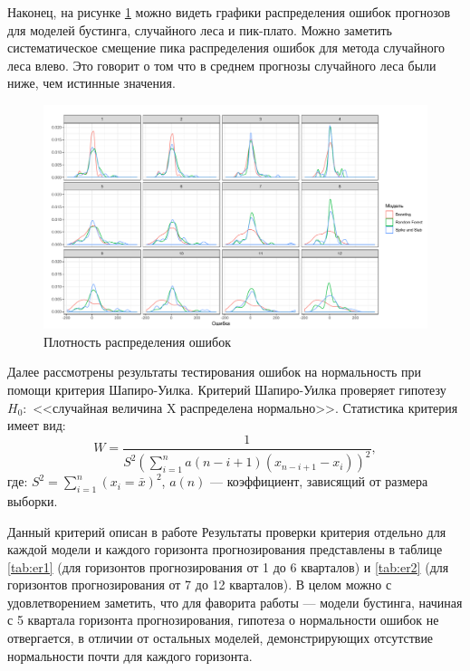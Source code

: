 Наконец, на рисунке \ref{fig:error3} можно видеть графики распределения ошибок прогнозов для моделей бустинга, случайного леса и пик-плато. Можно заметить систематическое смещение пика распределения ошибок для метода случайного леса влево. Это говорит о том что в среднем прогнозы случайного леса были ниже, чем истинные значения.
\begin{figure}[hp]
    \centering
    \includegraphics[width = \textwidth]{error3.pdf}
    \caption{Плотность распределения ошибок}
    \label{fig:error3}
\end{figure}

Далее рассмотрены результаты тестирования ошибок на нормальность при помощи критерия Шапиро-Уилка. Критерий Шапиро-Уилка проверяет гипотезу $H_0:$ <<случайная величина X распределена нормально>>. Статистика критерия имеет вид:
\begin{equation}
    W = \frac{1}{S^2\left(\sum_{i=1}^n a(n-i+1) (x_{n-i+1} - x_i)\right)^2},
\end{equation}
где: $S^2 = \sum_{i=1}^{n} \left(x_i = \bar{x}\right)^2$, $a(n)$ --- коэффициент, зависящий от размера выборки.

Данный критерий описан в работе \cite{shapiro1965analysis}
Результаты проверки критерия отдельно для каждой модели и каждого горизонта прогнозирования представлены в таблице \ref{tab:er1} (для горизонтов прогнозирования от 1 до 6 кварталов) и \ref{tab:er2} (для горизонтов прогнозирования от 7 до 12 кварталов). В целом можно с удовлетворением заметить, что для фаворита работы --- модели бустинга, начиная с 5 квартала горизонта прогнозирования, гипотеза о нормальности ошибок не отвергается, в отличии от остальных моделей, демонстрирующих отсутствие нормальности почти для каждого горизонта.

